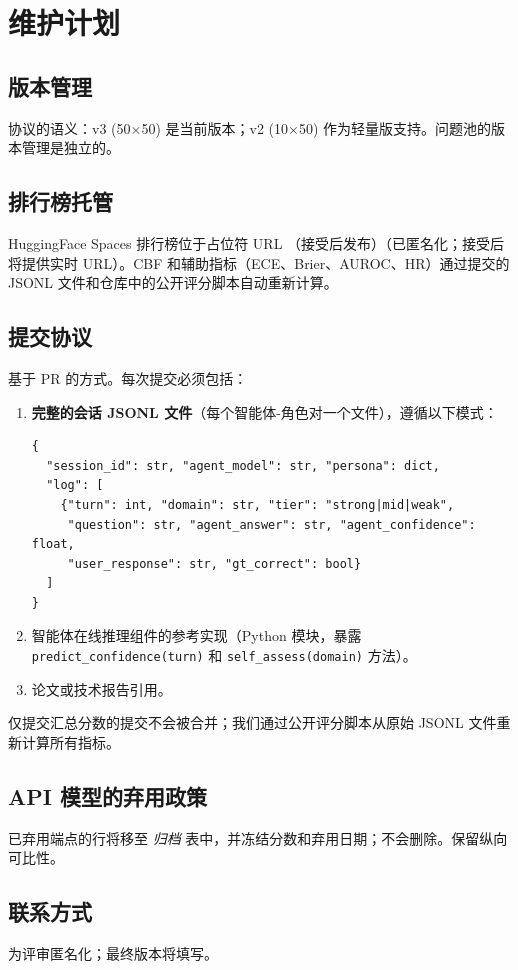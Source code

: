 \documentclass[11pt,a4paper,fontset=fandol]{ctexart}
\begin{document}
\section*{维护计划}

\subsection*{版本管理}
协议的语义：v3 (50$\times$50) 是当前版本；v2 (10$\times$50) 作为轻量版支持。问题池的版本管理是独立的。

\subsection*{排行榜托管}
HuggingFace Spaces 排行榜位于占位符 URL （接受后发布）（已匿名化；接受后将提供实时 URL）。CBF 和辅助指标（ECE、Brier、AUROC、HR）通过提交的 JSONL 文件和仓库中的公开评分脚本自动重新计算。

\subsection*{提交协议}
基于 PR 的方式。每次提交必须包括：
\begin{enumerate}[nosep,leftmargin=1.4em]
  \item \textbf{完整的会话 JSONL 文件}（每个智能体-角色对一个文件），遵循以下模式：
\begin{verbatim}
{
  "session_id": str, "agent_model": str, "persona": dict,
  "log": [
    {"turn": int, "domain": str, "tier": "strong|mid|weak",
     "question": str, "agent_answer": str, "agent_confidence": float,
     "user_response": str, "gt_correct": bool}
  ]
}
\end{verbatim}
  \item 智能体在线推理组件的参考实现（Python 模块，暴露 \texttt{predict\_confidence(turn)} 和 \texttt{self\_assess(domain)} 方法）。
  \item 论文或技术报告引用。
\end{enumerate}
仅提交汇总分数的提交不会被合并；我们通过公开评分脚本从原始 JSONL 文件重新计算所有指标。

\subsection*{API 模型的弃用政策}
已弃用端点的行将移至 \emph{归档} 表中，并冻结分数和弃用日期；不会删除。保留纵向可比性。

\subsection*{联系方式}
为评审匿名化；最终版本将填写。
\end{document}
